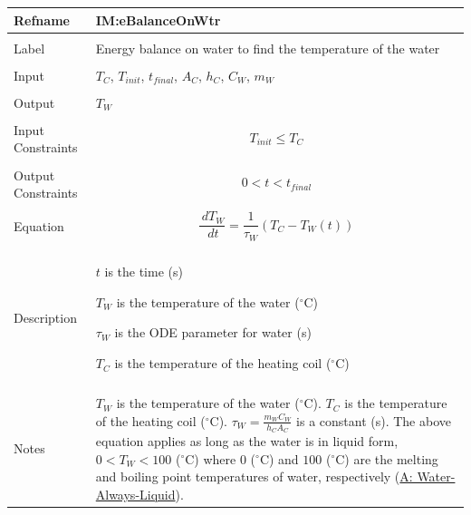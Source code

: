\documentclass[12pt]{article}
\begin{document}
\noindent \begin{minipage}{\textwidth}
\begin{tabular}{>{\raggedright}p{}>{\raggedright\arraybackslash}p{}}
\toprule \textbf{Refname} & \textbf{IM:eBalanceOnWtr}
\label{IM:eBalanceOnWtr}
\\ \midrule \\
Label & Energy balance on water to find the temperature of the water
\\ \midrule \\
Input & ${T_{C}}$, ${T_{init}}$, ${t_{final}}$, ${A_{C}}$, ${h_{C}}$, ${C_{W}}$, ${m_{W}}$
\\ \midrule \\
Output & ${T_{W}}$
\\ \midrule \\
Input Constraints & \begin{displaymath}
                    {T_{init}}\leq{}{T_{C}}
                    \end{displaymath}
\\ \midrule \\
Output Constraints & \begin{displaymath}
                     0<t<{t_{final}}
                     \end{displaymath}
\\ \midrule \\
Equation & \begin{displaymath}
           \frac{\,d{T_{W}}}{\,dt}=\frac{1}{{τ_{W}}} \left({T_{C}}-{T_{W}}\left(t\right)\right)
           \end{displaymath}
\\ \midrule \\
Description & \begin{symbDescription}
              \item{$t$ is the time (s)}
              \item{${T_{W}}$ is the temperature of the water (${}^{\circ}$C)}
              \item{${τ_{W}}$ is the ODE parameter for water (s)}
              \item{${T_{C}}$ is the temperature of the heating coil (${}^{\circ}$C)}
              \end{symbDescription}
\\ \midrule \\
Notes & ${T_{W}}$ is the temperature of the water (${}^{\circ}$C). ${T_{C}}$ is the temperature of the heating coil (${}^{\circ}$C). ${τ_{W}}=\frac{{m_{W}} {C_{W}}}{{h_{C}} {A_{C}}}$ is a constant (s). The above equation applies as long as the water is in liquid form, $0<{T_{W}}<100$ (${}^{\circ}$C) where $0$ (${}^{\circ}$C) and $100$ (${}^{\circ}$C) are the melting and boiling point temperatures of water, respectively (\hyperref[assumpWAL]{A: Water-Always-Liquid}).

\end{tabular}
\end{minipage}
\end{document}
